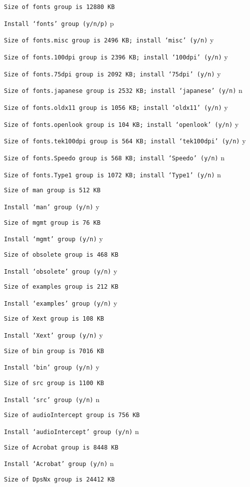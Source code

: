 {\tt Size of fonts group is 12880 KB}

{\tt Install `fonts' group (y/n/p)} p

{\tt Size of fonts.misc group is 2496 KB; install `misc' (y/n)} y

{\tt Size of fonts.100dpi group is 2396 KB; install `100dpi' (y/n)} y

{\tt Size of fonts.75dpi group is 2092 KB; install `75dpi' (y/n)} y

{\tt Size of fonts.japanese group is 2532 KB; install `japanese' (y/n)} n

{\tt Size of fonts.oldx11 group is 1056 KB; install `oldx11' (y/n)} y

{\tt Size of fonts.openlook group is 104 KB; install `openlook' (y/n)} y

{\tt Size of fonts.tek100dpi group is 564 KB; install `tek100dpi' (y/n)} y

{\tt Size of fonts.Speedo group is 568 KB; install `Speedo' (y/n)} n

{\tt Size of fonts.Type1 group is 1072 KB; install `Type1' (y/n)} n

{\tt Size of man group is 512 KB}

{\tt Install `man' group (y/n)} y

{\tt Size of mgmt group is 76 KB}

{\tt Install `mgmt' group (y/n)} y

{\tt Size of obsolete group is 468 KB}

{\tt Install `obsolete' group (y/n)} y

{\tt Size of examples group is 212 KB}

{\tt Install `examples' group (y/n)} y

{\tt Size of Xext group is 108 KB}

{\tt Install `Xext' group (y/n)} y

{\tt Size of bin group is 7016 KB}

{\tt Install `bin' group (y/n)} y

{\tt Size of src group is 1100 KB}

{\tt Install `src' group (y/n)} n

{\tt Size of audioIntercept group is 756 KB}

{\tt Install `audioIntercept' group (y/n)} n

{\tt Size of Acrobat group is 8448 KB}

{\tt Install `Acrobat' group (y/n)} n

{\tt Size of DpsNx group is 24412 KB}

